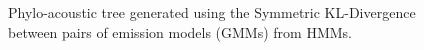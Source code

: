 \documentclass[pdftex,11pt,a4paper]{article}
\theoremstyle{definition}
\theoremstyle{remark}
\begin{document}
\begin{figure}
\noindent{}
    \caption{Phylo-acoustic tree generated using the Symmetric KL-Divergence between pairs of emission models (GMMs) from HMMs.}
    \label{fig:gmmskld}
\end{figure}
\end{document}
